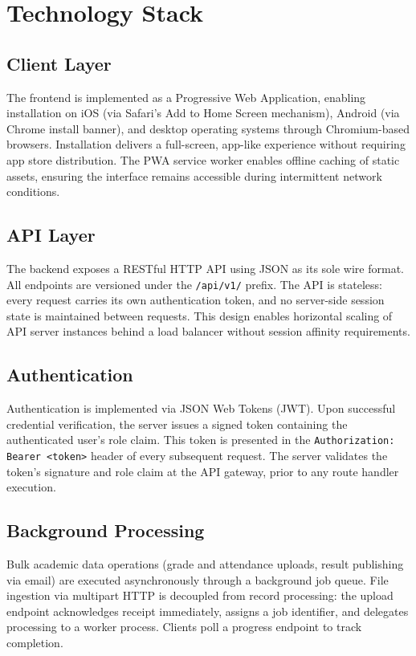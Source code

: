 \documentclass[12pt,a4paper]{report}
\newcommand{\api}[1]{\texttt{\small #1}}
\newcommand{\code}[1]{\texttt{#1}}
\begin{document}
\section{Technology Stack}

\subsection{Client Layer}
The frontend is implemented as a Progressive Web Application, enabling installation on iOS (via Safari's Add to Home Screen mechanism), Android (via Chrome install banner), and desktop operating systems through Chromium-based browsers. Installation delivers a full-screen, app-like experience without requiring app store distribution. The PWA service worker enables offline caching of static assets, ensuring the interface remains accessible during intermittent network conditions.

\subsection{API Layer}
The backend exposes a RESTful HTTP API using JSON as its sole wire format. All endpoints are versioned under the \api{/api/v1/} prefix. The API is stateless: every request carries its own authentication token, and no server-side session state is maintained between requests. This design enables horizontal scaling of API server instances behind a load balancer without session affinity requirements.

\subsection{Authentication}
Authentication is implemented via JSON Web Tokens (JWT). Upon successful credential verification, the server issues a signed token containing the authenticated user's role claim. This token is presented in the \code{Authorization: Bearer <token>} header of every subsequent request. The server validates the token's signature and role claim at the API gateway, prior to any route handler execution.

\subsection{Background Processing}
Bulk academic data operations (grade and attendance uploads, result publishing via email) are executed asynchronously through a background job queue. File ingestion via multipart HTTP is decoupled from record processing: the upload endpoint acknowledges receipt immediately, assigns a job identifier, and delegates processing to a worker process. Clients poll a progress endpoint to track completion.
\end{document}
